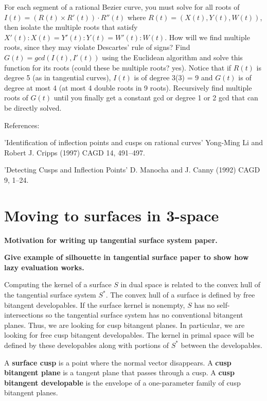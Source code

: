 \documentclass[12pt]{article}
\begin{document}
For each segment of a rational Bezier curve, 
you must solve for all roots of $I(t) = (R(t) \times R'(t)) \cdot R''(t)$
where $R(t) = (X(t),Y(t),W(t))$,
then isolate the multiple roots that satisfy 
$X'(t) : X(t) = Y'(t) : Y(t) = W'(t) : W(t)$.
How will we find multiple roots, since they may violate Descartes'
rule of signs?
Find $G(t) = gcd(I(t),I'(t))$ using the Euclidean algorithm
and solve this function for its roots (could these be multiple roots? yes).
Notice that if $R(t)$ is degree 5 (as in tangential curves),
$I(t)$ is of degree 3(3) = 9 and 
$G(t)$ is of degree at most 4 (at most 4 double roots in 9 roots).
Recursively find multiple roots of $G(t)$
until you finally get a constant gcd or degree 1 or 2 gcd that
can be directly solved.

References:

'Identification of inflection points and cusps on rational curves'
Yong-Ming Li and Robert J. Cripps (1997)
CAGD 14, 491--497.

'Detecting Cusps and Inflection Points'
D. Manocha and J. Canny (1992)
CAGD 9, 1--24.

\section{Moving to surfaces in 3-space}

{\bf Motivation for writing up tangential surface system paper.}

{\bf Give example of silhouette in tangential surface paper
	to show how lazy evaluation works.}

Computing the kernel of a surface $S$ in dual space
is related to the convex hull of the tangential surface system $S^*$.
The convex hull of a surface is defined by free bitangent developables.
If the surface kernel is nonempty, $S$ has no self-intersections
so the tangential surface system has no conventional bitangent planes.
Thus, we are looking for cusp bitangent planes.
In particular, we are looking for free cusp bitangent developables.
The kernel in primal space will be defined by these developables
along with portions of $S^*$ between the developables.

\begin{defn2}
A {\bf surface cusp} is a point where the normal vector disappears.
A {\bf cusp bitangent plane} is a tangent plane that passes through a cusp.
A {\bf cusp bitangent developable} is the envelope of a one-parameter family
of cusp bitangent planes.
\end{defn2}
\end{document}
